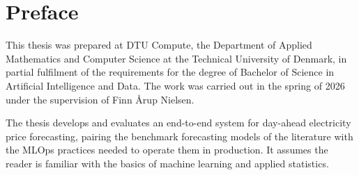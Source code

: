 \section*{Preface}
This thesis was prepared at DTU Compute, the Department of Applied Mathematics
and Computer Science at the Technical University of Denmark, in partial
fulfilment of the requirements for the degree of Bachelor of Science in
Artificial Intelligence and Data. The work was carried out in the spring of 2026
under the supervision of Finn \AA{}rup Nielsen.

The thesis develops and evaluates an end-to-end system for day-ahead electricity
price forecasting, pairing the benchmark forecasting models of the literature
with the MLOps practices needed to operate them in production. It assumes the
reader is familiar with the basics of machine learning and applied statistics.

\vfill

\begin{center}
\namesigdate{\thesisauthor~-~\studentnumber}
\end{center}

\vfill
